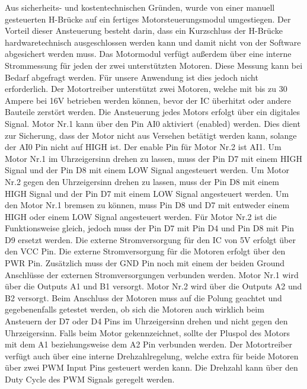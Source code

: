 Aus sicherheits- und kostentechnischen Gründen, wurde von einer manuell gesteuerten H-Brücke auf ein fertiges Motorsteuerungsmodul umgestiegen. Der Vorteil dieser Ansteuerung besteht darin, dass ein Kurzschluss der H-Brücke hardwaretechnisch ausgeschlossen werden kann und damit nicht von der Software abgesichert werden muss. Das Motormodul verfügt außerdem über eine interne Strommessung für jeden der zwei unterstützten Motoren. Diese Messung kann bei Bedarf abgefragt werden. Für unsere Anwendung ist dies jedoch nicht erforderlich. Der Motortreiber unterstützt zwei Motoren, welche mit bis zu 30 Ampere bei 16V betrieben werden können, bevor der IC überhitzt oder andere Bauteile zerstört werden. Die Ansteuerung jedes Motors erfolgt über ein digitales Signal. Motor Nr.1 kann über den Pin AI0 aktiviert (enabled) werden. Dies dient zur Sicherung, dass der Motor nicht aus Versehen betätigt werden kann, solange der AI0 Pin nicht auf HIGH ist. Der enable Pin für Motor Nr.2 ist AI1. Um Motor Nr.1 im Uhrzeigersinn drehen zu lassen, muss der Pin D7 mit einem HIGH Signal und der Pin D8 mit einem LOW Signal angesteuert werden. Um Motor Nr.2 gegen den Uhrzeigersinn drehen zu lassen, muss der Pin D8 mit einem HIGH Signal und der Pin D7 mit einem LOW Signal angesteuert werden. Um den Motor Nr.1 bremsen zu können, muss Pin D8 und D7 mit entweder einem HIGH oder einem LOW Signal angesteuert werden. Für Motor Nr.2 ist die Funktionsweise gleich, jedoch muss der Pin D7 mit Pin D4 und Pin D8 mit Pin D9 ersetzt werden. Die externe Stromversorgung für den IC von 5V erfolgt über den VCC Pin. Die externe Stromversorgung für die Motoren erfolgt über den PWR Pin. Zusätzlich muss der GND Pin noch mit einem der beiden Ground Anschlüsse der externen Stromversorgungen verbunden werden. Motor Nr.1 wird über die Outputs A1 und B1 versorgt. Motor Nr.2 wird über die Outputs A2 und B2 versorgt. Beim Anschluss der Motoren muss auf die Polung geachtet und gegebenenfalls getestet werden, ob sich die Motoren auch wirklich beim Ansteuern der D7 oder D4 Pins im Uhrzeigersinn drehen und nicht gegen den Uhrzeigersinn. Falls beim Motor gekennzeichnet, sollte der Pluspol des Motors mit dem A1 beziehungsweise dem A2 Pin verbunden werden. Der Motortreiber verfügt auch über eine interne Drehzahlregelung, welche extra für beide Motoren über zwei PWM Input Pins gesteuert werden kann. Die Drehzahl kann über den Duty Cycle des PWM Signals geregelt werden.
